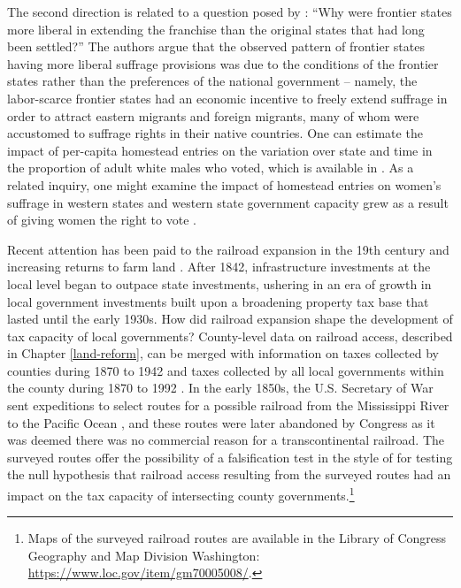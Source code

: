 The second direction is related to a question posed by \citet{engerman2005evolution}: ``Why were frontier states more liberal in extending the franchise than the original states that had long been settled?'' The authors argue that the observed pattern of frontier states having more liberal suffrage provisions was due to the conditions of the frontier states rather than the preferences of the national government -- namely, the labor-scarce frontier states had an economic incentive to freely extend suffrage in order to attract eastern migrants and foreign migrants, many of whom were accustomed to suffrage rights in their native countries. One can estimate the impact of per-capita homestead entries on the variation over state and time in the proportion of adult white males who voted, which is available in \citet{mccormick1960new}. As a related inquiry, one might examine the impact of homestead entries on women's suffrage in western states \citep{teele2018west} and western state government capacity grew as a result of giving women the right to vote \citep{lott1999did}.

Recent attention has been paid to the railroad expansion in the 19th century and increasing returns to farm land  \citep{donaldson2016railroads}. After 1842, infrastructure investments at the local level began to outpace state investments, ushering in an era of growth in local government investments built upon a broadening property tax base that lasted until the early 1930s. How did railroad expansion shape the development of tax capacity of local governments? County-level data on railroad access, described in Chapter \ref{land-reform}, can be merged with information on taxes collected by counties during 1870 to 1942 and taxes collected by all local governments within the county during 1870 to 1992 \citep{rhode2003assessing}. In the early 1850s, the U.S. Secretary of War sent expeditions to select routes for a possible railroad from the Mississippi River to the Pacific Ocean \citep{blake1857geological,baird1858reports}, and these routes were later abandoned by Congress as it was deemed there was no commercial reason for a transcontinental railroad. The surveyed routes offer the possibility of a falsification test in the style of \citep{donaldson2018railroads} for testing the null hypothesis that railroad access resulting from the surveyed routes had an impact on the tax capacity of intersecting county governments.\footnote{Maps of the surveyed railroad routes are available in the Library of Congress Geography and Map Division Washington: \url{https://www.loc.gov/item/gm70005008/}.}


